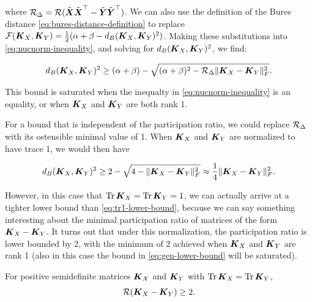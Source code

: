 where $\mathcal{R}_\Delta = \mathcal{R}(\tilde{\boldsymbol{X}} \tilde{\boldsymbol{X}}^\top - \tilde{\boldsymbol{Y}}\tilde{\boldsymbol{Y}}^\top)$.
We can also use the definition of the Bures distance \cref{eq:bures-distance-definition} to replace $\mathcal{F}(\boldsymbol{K}_X,\boldsymbol{K}_Y) = \frac{1}{2}(\alpha + \beta - d_B(\boldsymbol{K}_X,\boldsymbol{K}_Y)^2)$. 
Making these substitutions into \cref{eq:nucnorm-inequality}, and solving for $d_B(\boldsymbol{K}_X,\boldsymbol{K}_Y)^2$, we find:

\begin{equation}\label{eq:gen-lower-bound}
    d_B(\boldsymbol{K}_X,\boldsymbol{K}_Y)^2 \ge (\alpha + \beta) - \sqrt{(\alpha + \beta )^2 - \mathcal{R}_\Delta \|\boldsymbol{K}_X-\boldsymbol{K}_Y \|_F^2}.
\end{equation}

This bound is saturated when the inequalty in \cref{eq:nucnorm-inequality} is an equality, or when $\boldsymbol{K}_X$ and $\boldsymbol{K}_Y$ are both rank 1.  

For a bound that is independent of the participation ratio, we could replace $\mathcal{R}_\Delta$ with its ostensible minimal value of 1.
When $\boldsymbol{K}_X$ and $\boldsymbol{K}_Y$ are normalized to have trace 1, we would then have 

\begin{equation}\label{eq:tr1-lower-bound}
    d_B(\boldsymbol{K}_X,\boldsymbol{K}_Y)^2 \ge 2 - \sqrt{4 -  \|\boldsymbol{K}_X-\boldsymbol{K}_Y \|_F^2} \approx \frac{1}{4} \|\boldsymbol{K}_X - \boldsymbol{K}_Y \|_F^2.
\end{equation}

However, in this case that $\operatorname*{Tr}\boldsymbol{K}_X = \operatorname*{Tr} \boldsymbol{K}_Y = 1 $, we can actually arrive at a tighter lower bound than \cref{eq:tr1-lower-bound}, because we can say something interesting about the minimal participation ratio of matrices of the form $\boldsymbol{K}_X - \boldsymbol{K}_Y$.  
It turns out that under this normalization, the participation ratio is lower bounded by $2$, with the minimum of $2$ achieved when $\boldsymbol{K}_X$ and $\boldsymbol{K}_Y$ are rank 1 (also in this case the bound in \cref{eq:gen-lower-bound} will be saturated).  

\begin{lemma}
For positive semidefinite matrices $\boldsymbol{K}_X$ and $\boldsymbol{K}_Y$ with $\operatorname*{Tr} \boldsymbol{K}_X = \operatorname*{Tr} \boldsymbol{K}_Y$, 
\begin{equation}\label{eq:minimal-pr}
\mathcal{R}(\boldsymbol{K}_X-\boldsymbol{K}_Y) \ge 2.
\end{equation}
\end{lemma}

